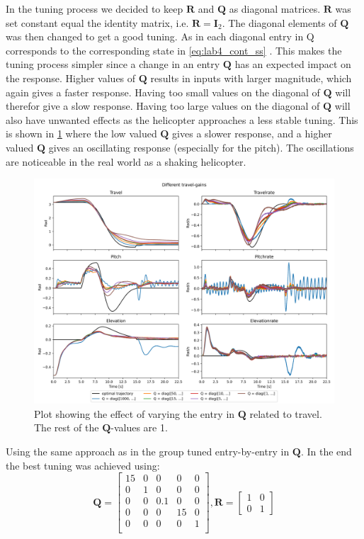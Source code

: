 \documentclass[../main.tex]{subfiles}
\begin{document}
In the tuning process we decided to keep $ \bm R $ and $ \bm Q $ as diagonal matrices. $ \bm R $ was set constant equal the identity matrix, i.e. $\bm R = \bm I_2$. The diagonal elements of $ \bm Q $ was then changed to get a good tuning. As in each diagonal entry in Q corresponds to the corresponding state in \cref{eq:lab4_cont_ss} . This makes the tuning process simpler since a change in an entry $ \bm Q $ has an expected impact on the response. Higher values of $ \bm Q $ results in inputs with larger magnitude, which again gives a faster response. Having too small values on the diagonal of $ \bm Q $ will therefor give a slow response. Having too large values on the diagonal of $ \bm Q $ will also have unwanted effects as the helicopter approaches a less stable tuning. This is shown in \cref{fig:lab4_diff_Q_values} where the low valued $ \bm Q $ gives a slower response, and a higher valued $ \bm Q $ gives an oscillating response (especially for the pitch). The oscillations are noticeable in the real world as a shaking helicopter.
\begin{figure}[h]
	\centering
	\includegraphics[width=\linewidth]{figures/LAB4_travel_gains.png}
	\caption{Plot showing the effect of varying the entry in $ \bm Q $ related to travel. The rest of the $ \bm Q $-values are 1.}
	\label{fig:lab4_diff_Q_values}
\end{figure}

Using the same approach as in the group tuned entry-by-entry in $ \bm Q $. In the end the best tuning was achieved using: 
\begin{equation}\label{key}
	\bm Q = \begin{bmatrix}
		15 & 0 & 0 & 0 & 0 \\
		0 & 1 & 0 & 0 & 0 \\
		0 & 0 & 0.1 & 0 & 0 \\
		0 & 0 & 0 & 15 & 0 \\
		0 & 0 & 0 & 0 & 1 \\
	\end{bmatrix}, 
	\bm R = \begin{bmatrix}
		1 & 0 \\ 
		0 & 1
	\end{bmatrix}
\end{equation}
\end{document}
